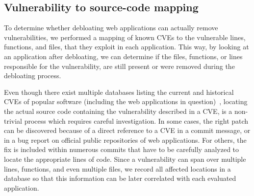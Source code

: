 \subsection{Vulnerability to source-code mapping}
\label{sec:vulntosourcemapping}
To determine whether debloating web applications can actually remove
vulnerabilities, we performed a mapping of known CVEs to the vulnerable lines,
functions, and files, that they exploit in each application. This way, by
looking at an application after debloating, we can determine if the files,
functions, or lines responsible for the vulnerability, are still present or
were removed during the debloating process.


Even though there exist multiple databases listing the current and
historical CVEs of popular software (including the web applications in
question)~\cite{cvedetails,nistgov}, locating the actual source code
containing the vulnerability described in a CVE, is a non-trivial process
which requires careful investigation. In some cases, the right patch can be
discovered because of a direct reference to a CVE in a commit message, or in
a bug report on official public repositories of web applications. For others,
the fix is included within numerous commits that have to be carefully analyzed
to locate the appropriate lines of code. Since a vulnerability can span over
multiple lines, functions, and even multiple files, we record all affected
locations in a database so that this information can be later correlated
with each evaluated application.



